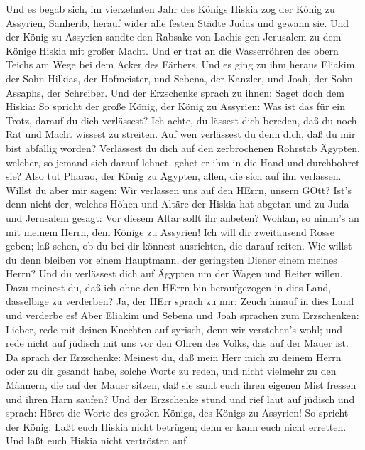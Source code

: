 Und es begab sich, im vierzehnten Jahr des Königs Hiskia
zog der König zu Assyrien, Sanherib, herauf wider alle festen Städte
Judas und gewann sie.  Und der König zu Assyrien sandte den
Rabsake von Lachis gen Jerusalem zu dem Könige Hiskia mit großer Macht.
Und er trat an die Wasserröhren des obern Teichs am Wege bei dem Acker
des Färbers.  Und es ging zu ihm heraus Eliakim, der Sohn
Hilkias, der Hofmeister, und Sebena, der Kanzler, und Joah, der Sohn
Assaphs, der Schreiber.  Und der Erzschenke sprach zu ihnen:
Saget doch dem Hiskia: So spricht der große König, der König zu
Assyrien: Was ist das für ein Trotz, darauf du dich verlässest?
 Ich achte, du lässest dich bereden, daß du noch Rat und
Macht wissest zu streiten. Auf wen verlässest du denn dich, daß du mir
bist abfällig worden?  Verlässest du dich auf den
zerbrochenen Rohrstab Ägypten, welcher, so jemand sich darauf lehnet,
gehet er ihm in die Hand und durchbohret sie? Also tut Pharao, der König
zu Ägypten, allen, die sich auf ihn verlassen.  Willst du
aber mir sagen: Wir verlassen uns auf den HErrn, unsern GOtt? Ist's denn
nicht der, welches Höhen und Altäre der Hiskia hat abgetan und zu Juda
und Jerusalem gesagt: Vor diesem Altar sollt ihr anbeten? 
Wohlan, so nimm's an mit meinem Herrn, dem Könige zu Assyrien! Ich will
dir zweitausend Rosse geben; laß sehen, ob du bei dir könnest
ausrichten, die darauf reiten.  Wie willst du denn bleiben
vor einem Hauptmann, der geringsten Diener einem meines Herrn? Und du
verlässest dich auf Ägypten um der Wagen und Reiter willen.
 Dazu meinest du, daß ich ohne den HErrn bin heraufgezogen
in dies Land, dasselbige zu verderben? Ja, der HErr sprach zu mir: Zeuch
hinauf in dies Land und verderbe es!  Aber Eliakim und
Sebena und Joah sprachen zum Erzschenken: Lieber, rede mit deinen
Knechten auf syrisch, denn wir verstehen's wohl; und rede nicht auf
jüdisch mit uns vor den Ohren des Volks, das auf der Mauer ist.
 Da sprach der Erzschenke: Meinest du, daß mein Herr mich
zu deinem Herrn oder zu dir gesandt habe, solche Worte zu reden, und
nicht vielmehr zu den Männern, die auf der Mauer sitzen, daß sie samt
euch ihren eigenen Mist fressen und ihren Harn saufen?  Und
der Erzschenke stund und rief laut auf jüdisch und sprach: Höret die
Worte des großen Königs, des Königs zu Assyrien!  So
spricht der König: Laßt euch Hiskia nicht betrügen; denn er kann euch
nicht erretten.  Und laßt euch Hiskia nicht vertrösten auf
